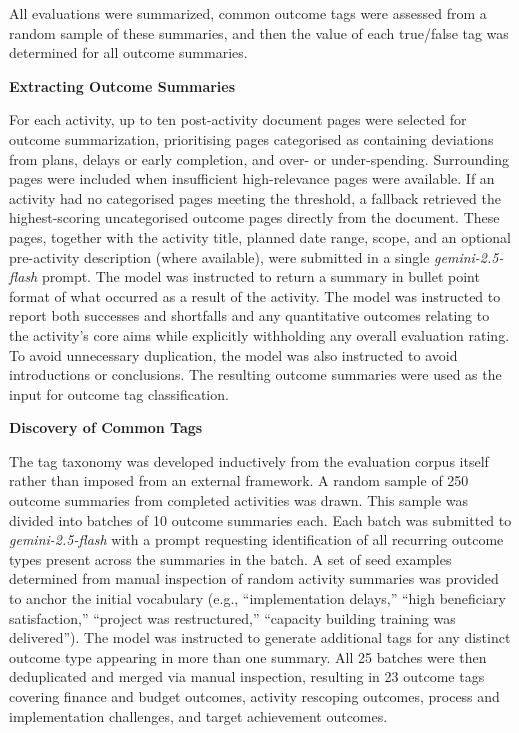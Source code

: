 \label{sec:outcome_tags_methods}
All evaluations were summarized, common outcome tags were assessed from a random sample of these summaries, and then the value of each true/false tag was determined for all outcome summaries.

\textbf{Extracting Outcome Summaries}

For each activity, up to ten post-activity document pages were selected for outcome summarization, prioritising pages categorised as containing deviations from plans, delays or early completion, and over- or under-spending. Surrounding pages were included when insufficient high-relevance pages were available. If an activity had no categorised pages meeting the threshold, a fallback retrieved the highest-scoring uncategorised outcome pages directly from the document. These pages, together with the activity title, planned date range, scope, and an optional pre-activity description (where available), were submitted in a single \emph{gemini-2.5-flash} prompt. The model was instructed to return a summary in bullet point format of what occurred as a result of the activity. The model was instructed to report both successes and shortfalls and any quantitative outcomes relating to the activity's core aims while explicitly withholding any overall evaluation rating. To avoid unnecessary duplication, the model was also instructed to avoid introductions or conclusions. The resulting outcome summaries were used as the input for outcome tag classification.

\textbf{Discovery of Common Tags}

The tag taxonomy was developed inductively from the evaluation corpus itself rather than imposed from an external framework. A random sample of 250 outcome summaries from completed activities was drawn. This sample was divided into batches of 10 outcome summaries each. Each batch was submitted to \emph{gemini-2.5-flash} with a prompt requesting identification of all recurring outcome types present across the summaries in the batch. A set of seed examples determined from manual inspection of random activity summaries was provided to anchor the initial vocabulary (e.g., ``implementation delays,'' ``high beneficiary satisfaction,'' ``project was restructured,'' ``capacity building training was delivered''). The model was instructed to generate additional tags for any distinct outcome type appearing in more than one summary. All 25 batches were then deduplicated and merged via manual inspection, resulting in 23 outcome tags covering finance and budget outcomes, activity rescoping outcomes, process and implementation challenges, and target achievement outcomes.

